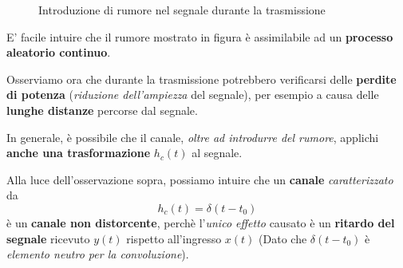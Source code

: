 \begin{figure}[!ht]
    \caption{Introduzione di rumore nel segnale durante la trasmissione}
    \label{fig:08_05_RumoreCanale}
\end{figure}

E' facile intuire che il rumore mostrato in figura è 
assimilabile ad un \textbf{processo aleatorio continuo}.

Osserviamo ora che durante la trasmissione potrebbero verificarsi delle \textbf{perdite di potenza} 
(\textit{riduzione dell'ampiezza} del segnale), per esempio a causa delle 
\textbf{lunghe distanze} percorse dal segnale.

\begin{remark}
    In generale, è possibile che il canale, \textit{oltre ad introdurre del rumore},
    applichi \textbf{anche una trasformazione} $h_c(t)$ al segnale.
\end{remark}

Alla luce dell'osservazione sopra, possiamo intuire che un \textbf{canale} 
\textit{caratterizzato} da
\[
    h_c(t) = \delta(t-t_{0})
\]
è un \textbf{canale non distorcente}, perchè l'\textit{unico effetto} causato
è un \textbf{ritardo del segnale} ricevuto $y(t)$ rispetto all'ingresso $x(t)$
(Dato che $\delta(t-t_{0})$ è \textit{elemento neutro per la convoluzione}).

